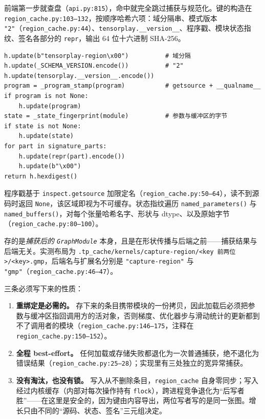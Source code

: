 前端第一步就查盘（\texttt{api.py:815}），命中就完全跳过捕获与规范化。键的构造在 \texttt{region\_cache.py:103--132}，按顺序哈希六项：域分隔串、模式版本 \texttt{"2"}（\texttt{region\_cache.py:44}）、\texttt{tensorplay.\_\_version\_\_}、程序戳、模块状态指纹、签名各部分的 \texttt{repr}，输出 64 位十六进制 SHA-256。

\begin{lstlisting}[caption={区域键的构造（\texttt{region\_cache.py:120--132}）。}, label=lst:fe:regionkey, style=pystyle]
h.update(b"tensorplay-region\x00")          # 域分隔
h.update(_SCHEMA_VERSION.encode())          # "2"
h.update(tensorplay.__version__.encode())
program = _program_stamp(program)           # getsource + __qualname__
if program is not None:
    h.update(program)
state = _state_fingerprint(module)          # 参数与缓冲区的字节
if state is not None:
    h.update(state)
for part in signature_parts:
    h.update(repr(part).encode())
    h.update(b"\x00")
return h.hexdigest()
\end{lstlisting}

程序戳基于 \texttt{inspect.getsource} 加限定名（\texttt{region\_cache.py:50--64}），读不到源码时返回 \texttt{None}，该区域即视为不可缓存。状态指纹遍历 \texttt{named\_parameters()} 与 \texttt{named\_buffers()}，对每个张量哈希名字、形状与 dtype、以及原始字节（\texttt{region\_cache.py:80--100}）。

存的是\emph{捕获后的 \texttt{GraphModule}} 本身，且是在形状传播与后端之前——捕获结果与后端无关。实测布局为 \texttt{.tp\_cache/kernels/capture-region/<key 前两位>/<key>.gmp}，后端名与扩展名分别是 \texttt{"capture-region"} 与 \texttt{"gmp"}（\texttt{region\_cache.py:46--47}）。

三条必须写下来的性质：

\begin{enumerate}[nosep, leftmargin=1.2em]
\item \textbf{重绑定是必需的。} 存下来的条目携带模块的一份拷贝，因此加载后必须把参数与缓冲区指回调用方的活对象，否则梯度、优化器步与滑动统计的更新都到不了调用者的模块（\texttt{region\_cache.py:146--175}，注释在 \texttt{region\_cache.py:150--152}）。
\item \textbf{全程 best-effort。} 任何加载或存储失败都退化为一次普通捕获，绝不退化为错误结果（\texttt{region\_cache.py:25--28}）；实现里有三处独立的宽异常捕获。
\item \textbf{没有淘汰，也没有锁。} 写入从不删除条目，\texttt{region\_cache} 自身零同步；写入经过内核缓存（内部对每次操作持有 \texttt{flock}），跨进程竞争退化为“后写者胜”——在这里是安全的，因为键由内容导出，两位写者写的是同一张图。增长只由不同的“源码、状态、签名”三元组决定。
\end{enumerate}

